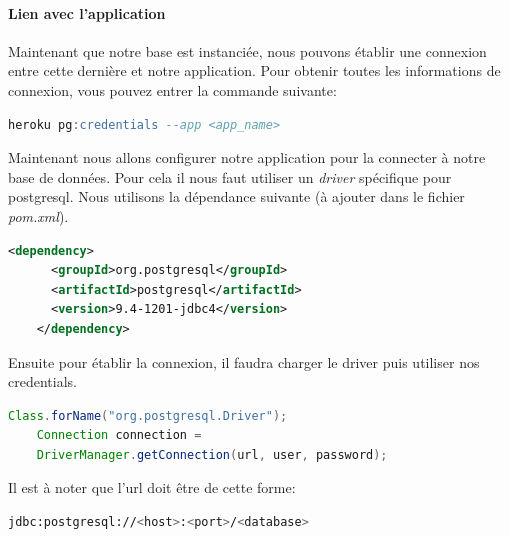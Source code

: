 \documentclass{article}
\begin{document}
	\paragraph{Lien avec l'application}
	  Maintenant que notre base est instanciée, nous pouvons établir une connexion entre cette dernière et notre application.
	  Pour obtenir toutes les informations de connexion, vous pouvez entrer la commande suivante:
	  \begin{lstlisting}[language=sql]
    heroku pg:credentials --app <app_name>
	  \end{lstlisting}
	  Maintenant nous allons configurer notre application pour la connecter à notre base de données. Pour cela il nous faut utiliser un \emph{driver} spécifique pour postgresql. 
	  Nous utilisons la dépendance suivante (à ajouter dans le fichier \emph{pom.xml}).
	  \begin{lstlisting}[language=xml]
    <dependency>
      <groupId>org.postgresql</groupId>
      <artifactId>postgresql</artifactId>
      <version>9.4-1201-jdbc4</version>
    </dependency>
	  \end{lstlisting}
	  Ensuite pour établir la connexion, il faudra charger le driver puis utiliser nos credentials.
	  \begin{lstlisting}[language=java]
    Class.forName("org.postgresql.Driver");
    Connection connection =  
	DriverManager.getConnection(url, user, password);
	  \end{lstlisting}
	  Il est à noter que l'url doit être de cette forme:
	  \begin{lstlisting}[language=bash]
    jdbc:postgresql://<host>:<port>/<database>
	  \end{lstlisting}
\end{document}
